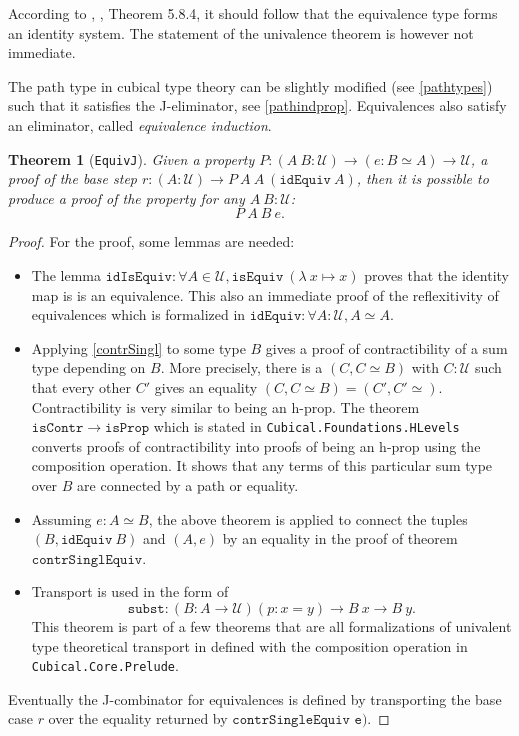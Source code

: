 \documentclass[12pt,a4paper,twoside,xetex]{book} %
\newcommand{\keyword}[1]{\emph{#1}\index{#1}}
\newtheorem{theorem}{Theorem}[section]
\newcommand{\op}[1]{\mathtt{#1}}
\newcommand{\type}{\mathcal{U}}
\begin{document}
According to \cite{Huber2016}, \cite{Voevodsky2013}, Theorem 5.8.4, it should 
follow that the equivalence type forms an identity system. The statement of the 
univalence theorem is however not immediate.

The path type in cubical type theory can be slightly modified (see 
\cref{pathtypes}) such that it satisfies the J-eliminator, see 
\cref{pathindprop}. Equivalences also satisfy an eliminator, called 
\keyword{equivalence induction}. 

\begin{theorem}[\texttt{EquivJ}]
Given a property $P: (A \ B : \mathcal{U}) \rightarrow (e : B \simeq A) 
\rightarrow \mathcal{U}$, a proof of the base step $r : (A : \mathcal{U}) 
\rightarrow P \ A\ A \ (\texttt{idEquiv} \ A)$, then it is possible to produce 
a proof of the property for any $A \ B: \mathcal{U}$: $$ P\  A \ B\ e.$$
\end{theorem}

\begin{proof}

For the proof, some lemmas are needed: 
\begin{itemize}

\item The lemma $\op{idIsEquiv}: \forall A \in \type , \op{isEquiv} \  
(\lambda \ x \mapsto x)$ proves that the identity map is is an equivalence. This also an immediate proof of the reflexitivity of equivalences which is formalized in  $\op{idEquiv}: \forall A : \type, A 
\simeq A$.

\item Applying \cref{contrSingl} to some type $B$ gives a proof of 
contractibility of a sum type depending on $B$. More precisely, there is a $(C, 
C \simeq B)$ with $C:\mathcal{U}$ such that every other $C'$ gives an equality 
$(C,C \simeq B) = (C',C'\simeq)$. Contractibility is very similar to being an 
h-prop. The theorem $\op{isContr} \rightarrow \op{isProp}$ which is stated in 
\texttt{Cubical.Foundations.HLevels} converts proofs of contractibility into 
proofs of being an h-prop using the composition operation. It shows that any 
terms of this particular sum type over $B$ are connected by a path or equality.


\item   Assuming $e : A \simeq B$, the above theorem is applied to connect the 
tuples $(B, \op{idEquiv} \ B)$ and $(A, e)$ by an equality in the proof of 
theorem $\op{contrSinglEquiv}$.

\item Transport is used in the form of $$\op{subst} : \left(B : A \rightarrow \type 
\right) (p : x = y) \rightarrow B \ x \rightarrow B \ y.$$ This theorem is part 
of a few theorems that are all formalizations of univalent type theoretical 
transport in defined with the composition operation in 
\texttt{Cubical.Core.Prelude}.

\end{itemize}

Eventually the J-combinator for equivalences is defined by transporting the 
base case $r$ over the equality returned by $\texttt{contrSingleEquiv e)}$.

\end{proof}
\end{document}
